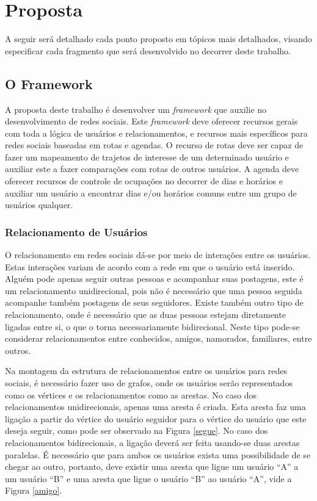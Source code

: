 \chapter{Proposta}
\label{chapter:Proposta}

A seguir será detalhado cada ponto proposto em tópicos mais detalhados, visando especificar cada fragmento que será desenvolvido no decorrer deste trabalho.

\section{O Framework}

A proposta deste trabalho é desenvolver um \textit{framework} que auxilie no desenvolvimento de redes sociais. Este \textit{framework} deve oferecer recursos gerais com toda a lógica de usuários e relacionamentos, e recursos mais específicos para redes sociais baseadas em rotas e agendas. O recurso de rotas deve ser capaz de fazer um mapeamento de trajetos de interesse de um determinado usuário e auxiliar este a fazer comparações com rotas de outros usuários. A agenda deve oferecer recursos de controle de ocupações no decorrer de dias e horários e auxiliar um usuário a encontrar dias e/ou horários comuns entre um grupo de usuários qualquer.

\subsection{Relacionamento de Usuários}

O relacionamento em redes sociais dá-se por meio de interações entre os usuários. Estas interações variam de acordo com a rede em que o usuário está inserido. Alguém pode apenas seguir outras pessoas e acompanhar suas postagens, este é um relacionamento unidirecional, pois não é necessário que uma pessoa seguida acompanhe também postagens de seus seguidores. Existe também outro tipo de relacionamento, onde é necessário que as duas pessoas estejam diretamente ligadas entre si, o que o torna necessariamente bidirecional. Neste tipo pode-se considerar relacionamentos entre conhecidos, amigos, namorados, familiares, entre outros.

Na montagem da estrutura de relacionamentos entre os usuários para redes sociais, é necessário fazer uso de grafos, onde os usuários serão representados como os vértices e os relacionamentos como as arestas. No caso dos relacionamentos unidirecionais, apenas uma aresta é criada. Esta aresta faz uma ligação a partir do vértice do usuário seguidor para o vértice do usuário que este deseja seguir, como pode ser observado na Figura \ref{segue}. No caso dos relacionamentos bidirecionais, a ligação deverá ser feita usando-se duas arestas paralelas. É necessário que para ambos os usuários exista uma possibilidade de se chegar ao outro, portanto, deve existir uma aresta que ligue um usuário ``A'' a um usuário ``B'' e uma aresta que ligue o usuário ``B'' ao usuário ``A'', vide a Figura \ref{amigo}.

